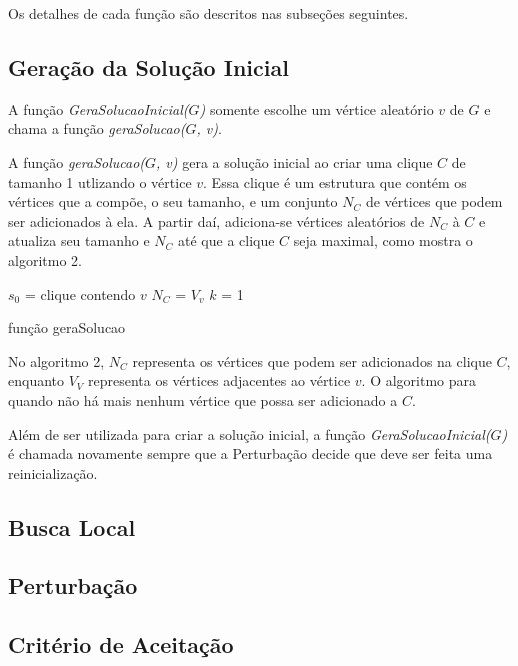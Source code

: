 \documentclass{article}
\begin{document}
Os  detalhes de cada função são descritos nas subseções seguintes. 

\subsection{Geração da Solução Inicial}

A função \textit{GeraSolucaoInicial($G$)} somente escolhe um vértice aleatório $v$ de $G$ e chama a função \textit{geraSolucao($G$, v)}.\par

A função \textit{geraSolucao($G$, v)} gera a solução inicial ao criar uma clique $C$ de tamanho 1 utlizando o vértice $v$. Essa clique é um estrutura que contém os vértices que a compõe, o seu tamanho, e um conjunto $N_C$ de vértices que podem ser adicionados à ela. A partir daí, adiciona-se vértices aleatórios de $N_C$ à $C$ e atualiza seu tamanho e $N_C$ até que a clique $C$ seja maximal, como mostra o algoritmo 2.\par

\begin{algorithm}
 $s_0$ = clique contendo $v$\;
 $N_C$ = $V_v$\;
 $k$ = 1\;
 \caption{função geraSolucao}
\end{algorithm}

No algoritmo 2, $N_C$ representa os vértices que podem ser adicionados na clique $C$, enquanto $V_V$ representa os vértices adjacentes ao vértice $v$. O algoritmo para quando não há mais nenhum vértice que possa ser adicionado a $C$.\par

Além de ser utilizada para criar a solução inicial, a função \textit{GeraSolucaoInicial($G$)} é chamada novamente sempre que a Perturbação decide que deve ser feita uma reinicialização.

\subsection{Busca Local}
\subsection{Perturbação}
\subsection{Critério de Aceitação}
\end{document}
